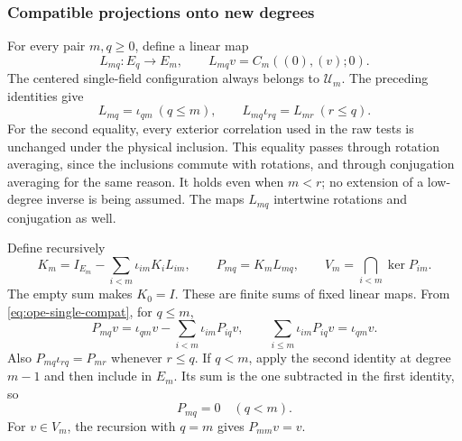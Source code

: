 \subsubsection{Compatible projections onto new degrees}
For every pair $m,q\geq0$, define a linear map
\[
 L_{mq}:E_q\to E_m,\qquad L_{mq}v=C_m((0),(v);0).
\]
The centered single-field configuration always belongs to $\mathcal U_m$.
The preceding identities give
\begin{equation}\label{eq:ope-single-compat}
 L_{mq}=\iota_{qm}\ (q\leq m),\qquad
 L_{mq}\iota_{rq}=L_{mr}\ (r\leq q).
\end{equation}
For the second equality, every exterior correlation used in the raw tests
is unchanged under the physical inclusion. This equality passes through
rotation averaging, since the inclusions commute with rotations, and
through conjugation averaging for the same reason. It holds even when
$m<r$; no extension of a low-degree inverse is being assumed.
The maps $L_{mq}$ intertwine rotations and conjugation as well.

Define recursively
\[
 K_m=I_{E_m}-\sum_{i<m}\iota_{im}K_iL_{im},\qquad
 P_{mq}=K_mL_{mq},\qquad
 V_m=\bigcap_{i<m}\ker P_{im}.
\]
The empty sum makes $K_0=I$. These are finite sums of fixed linear maps.
From \eqref{eq:ope-single-compat}, for $q\leq m$,
\begin{equation}\label{eq:ope-projection-recursion}
 P_{mq}v=\iota_{qm}v-\sum_{i<m}\iota_{im}P_{iq}v,
 \qquad
 \sum_{i\leq m}\iota_{im}P_{iq}v=\iota_{qm}v.
\end{equation}
Also $P_{mq}\iota_{rq}=P_{mr}$ whenever $r\leq q$.
If $q<m$, apply the second identity at degree $m-1$ and then include
in $E_m$. Its sum is the one subtracted in the first identity, so
\begin{equation}\label{eq:ope-higher-kills}
 P_{mq}=0\quad(q<m).
\end{equation}
For $v\in V_m$, the recursion with $q=m$ gives $P_{mm}v=v$.

